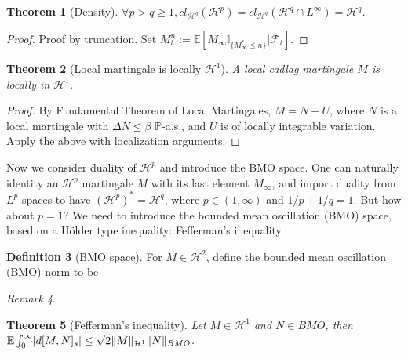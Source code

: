 \documentclass[openany,oneside]{book}
\newtheorem{thm}{Theorem}[section]
\theoremstyle{definition}
\newtheorem{defn}[thm]{Definition}
\theoremstyle{remark}
\newtheorem{rem}[thm]{Remark}
\newcommand{\E}{\mathbb{E}} %
\renewcommand{\P}{\mathbb{P}} %
\newcommand{\I}{\mathbb{I}} %
\DeclarePairedDelimiter{\abs}{\lvert}{\rvert} %
\DeclarePairedDelimiter{\norm}{\lVert}{\rVert} %
\newcommand{\sH}[1][2]{\mathcal{H}^{#1}} %
\begin{document}
\begin{thm}[Density]
$\forall p>q \ge 1, cl_{\mathcal{H}^q}(\mathcal{H}^p) = cl_{\mathcal{H}^q}(\mathcal{H}^q \cap L^\infty) = \mathcal{H}^q$.
\end{thm}
\begin{proof}
Proof by truncation. Set $M^n_t := \E[M_\infty \I_{\{M^*_\infty \le n\}}|\mathcal{F}_t]$.
\end{proof}

\begin{thm}[Local martingale is locally $\mathcal{H}^1$]
A local cadlag martingale $M$ is locally in $\mathcal{H}^1$.
\end{thm}
\begin{proof}
By Fundamental Theorem of Local Martingales, $M=N+U$, where $N$ is a local martingale with $\Delta N\le \beta$ $\P$-a.s., and $U$ is of locally integrable variation. Apply the above with localization arguments.
\end{proof}

Now we consider duality of $\mathcal{H}^p$ and introduce the BMO space. One can naturally identity an $\mathcal{H}^p$ martingale $M$ with its last element $M_\infty$, and import duality from $L^p$ spaces to have $(\mathcal{H}^p)^\ast = \mathcal{H}^{q}$, where $p\in(1,\infty)$ and $1/p+1/q=1$. But how about $p=1$? We need to introduce the bounded mean oscillation (BMO) space, based on a H\"older type inequality: Fefferman's inequality.

\begin{defn}[BMO space]
For $M\in \sH$, define the bounded mean oscillation (BMO) norm to be 
\end{defn}
\begin{rem}

\end{rem}

\begin{thm}[Fefferman's inequality]
Let $M\in\mathcal{H}^1$ and $N\in BMO$, then $\E\int_0^\infty \abs{d[M,N]_s} \le \sqrt{2} \norm{M}_{\mathcal{H}^1} \norm{N}_{BMO}$.
\end{thm}
\end{document}
